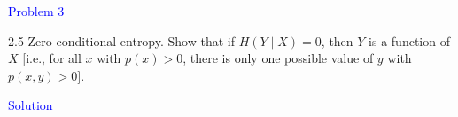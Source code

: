 \textcolor{blue}{Problem 3}

2.5 Zero conditional entropy. Show that if $H(Y \mid X)=0$, then $Y$ is a function of $X$ [i.e., for all $x$ with $p(x)>0$, there is only one possible value of $y$ with $p(x, y)>0]$.

\textcolor{blue}{Solution}




\newpage